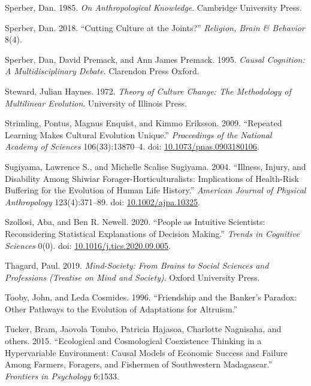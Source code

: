 \documentclass[
  11pt,
]{article}
\begin{document}
\leavevmode\hypertarget{ref-sperberAnthropologicalKnowledge1985}{}%
Sperber, Dan. 1985. \emph{On Anthropological Knowledge}. Cambridge University Press.

\leavevmode\hypertarget{ref-sperberCuttingCultureJoints2018}{}%
Sperber, Dan. 2018. ``Cutting Culture at the Joints?'' \emph{Religion, Brain \& Behavior} 8(4).

\leavevmode\hypertarget{ref-sperberCausalCognitionMultidisciplinary1995}{}%
Sperber, Dan, David Premack, and Ann James Premack. 1995. \emph{Causal Cognition: A Multidisciplinary Debate}. Clarendon Press Oxford.

\leavevmode\hypertarget{ref-stewardTheoryCultureChange1972}{}%
Steward, Julian Haynes. 1972. \emph{Theory of Culture Change: The Methodology of Multilinear Evolution}. University of Illinois Press.

\leavevmode\hypertarget{ref-strimlingRepeatedLearningMakes2009}{}%
Strimling, Pontus, Magnus Enquist, and Kimmo Eriksson. 2009. ``Repeated Learning Makes Cultural Evolution Unique.'' \emph{Proceedings of the National Academy of Sciences} 106(33):13870--4. doi: \href{https://doi.org/10.1073/pnas.0903180106}{10.1073/pnas.0903180106}.

\leavevmode\hypertarget{ref-sugiyamaIllnessInjuryDisability2004}{}%
Sugiyama, Lawrence S., and Michelle Scalise Sugiyama. 2004. ``Illness, Injury, and Disability Among Shiwiar Forager-Horticulturalists: Implications of Health-Risk Buffering for the Evolution of Human Life History.'' \emph{American Journal of Physical Anthropology} 123(4):371--89. doi: \href{https://doi.org/10.1002/ajpa.10325}{10.1002/ajpa.10325}.

\leavevmode\hypertarget{ref-szollosiPeopleIntuitiveScientists2020}{}%
Szollosi, Aba, and Ben R. Newell. 2020. ``People as Intuitive Scientists: Reconsidering Statistical Explanations of Decision Making.'' \emph{Trends in Cognitive Sciences} 0(0). doi: \href{https://doi.org/10.1016/j.tics.2020.09.005}{10.1016/j.tics.2020.09.005}.

\leavevmode\hypertarget{ref-thagardMindSocietyBrainsSocial2019}{}%
Thagard, Paul. 2019. \emph{Mind-Society: From Brains to Social Sciences and Professions (Treatise on Mind and Society)}. Oxford University Press.

\leavevmode\hypertarget{ref-toobyFriendshipBankerParadox1996a}{}%
Tooby, John, and Leda Cosmides. 1996. ``Friendship and the Banker's Paradox: Other Pathways to the Evolution of Adaptations for Altruism.''

\leavevmode\hypertarget{ref-tucker2015ecological}{}%
Tucker, Bram, Jaovola Tombo, Patricia Hajasoa, Charlotte Nagnisaha, and others. 2015. ``Ecological and Cosmological Coexistence Thinking in a Hypervariable Environment: Causal Models of Economic Success and Failure Among Farmers, Foragers, and Fishermen of Southwestern Madagascar.'' \emph{Frontiers in Psychology} 6:1533.
\end{document}
